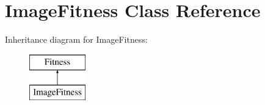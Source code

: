 \hypertarget{class_image_fitness}{\section{Image\-Fitness Class Reference}
\label{class_image_fitness}
}
Inheritance diagram for Image\-Fitness\-:\begin{figure}[H]
\begin{center}
\leavevmode
\includegraphics[height=2.000000cm]{class_image_fitness}
\end{center}
\end{figure}
